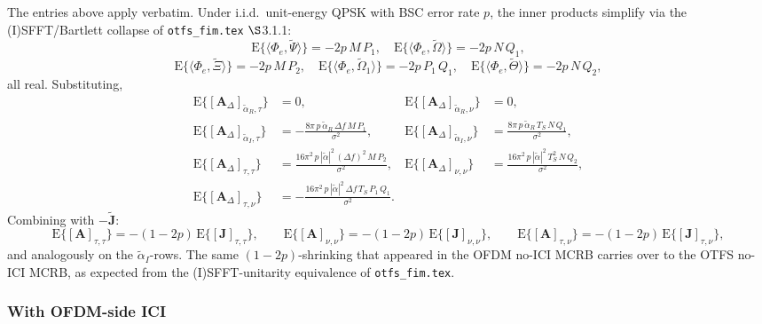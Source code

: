 \documentclass[11pt]{article}
\begin{document}
The entries above apply verbatim. Under i.i.d.\ unit-energy QPSK with BSC error rate \(p\), the inner products simplify via the (I)SFFT/Bartlett collapse of \texttt{otfs\_fim.tex} \(\S\)3.1.1:
\begin{equation}
    \mathrm{E}\{\langle \Phi_e, \tilde{\Psi}\rangle\} = -2p\, M\, P_1, \quad
    \mathrm{E}\{\langle \Phi_e, \tilde{\Omega}\rangle\} = -2p\, N\, Q_1,
\end{equation}
\begin{equation}
    \mathrm{E}\{\langle \Phi_e, \tilde{\Xi}\rangle\} = -2p\, M\, P_2, \quad
    \mathrm{E}\{\langle \Phi_e, \tilde{\Omega}_1\rangle\} = -2p\, P_1\, Q_1, \quad
    \mathrm{E}\{\langle \Phi_e, \tilde{\Theta}\rangle\} = -2p\, N\, Q_2,
\end{equation}
all real. Substituting,
\begin{align}
    \mathrm{E}\{[\bm{A}_\Delta]_{\tilde{\alpha}_R, \tau}\} &= 0, &
    \mathrm{E}\{[\bm{A}_\Delta]_{\tilde{\alpha}_R, \nu}\} &= 0, \\
    \mathrm{E}\{[\bm{A}_\Delta]_{\tilde{\alpha}_I, \tau}\} &= -\tfrac{8\pi\, p\, \tilde{\alpha}_R\, \Delta f\, M\, P_1}{\sigma^2}, &
    \mathrm{E}\{[\bm{A}_\Delta]_{\tilde{\alpha}_I, \nu}\} &= \tfrac{8\pi\, p\, \tilde{\alpha}_R\, T_S\, N\, Q_1}{\sigma^2}, \\
    \mathrm{E}\{[\bm{A}_\Delta]_{\tau, \tau}\} &= \tfrac{16\pi^2\, p\, |\tilde{\alpha}|^2\, (\Delta f)^2\, M\, P_2}{\sigma^2}, &
    \mathrm{E}\{[\bm{A}_\Delta]_{\nu, \nu}\} &= \tfrac{16\pi^2\, p\, |\tilde{\alpha}|^2\, T_S^2\, N\, Q_2}{\sigma^2}, \\
    \mathrm{E}\{[\bm{A}_\Delta]_{\tau, \nu}\} &= -\tfrac{16\pi^2\, p\, |\tilde{\alpha}|^2\, \Delta f\, T_S\, P_1\, Q_1}{\sigma^2}. & &
\end{align}
Combining with \(-\tilde{\bm{J}}\):
\begin{equation}
    \mathrm{E}\{[\bm{A}]_{\tau,\tau}\} = -(1-2p)\, \mathrm{E}\{[\bm{J}]_{\tau,\tau}\}, \qquad
    \mathrm{E}\{[\bm{A}]_{\nu,\nu}\} = -(1-2p)\, \mathrm{E}\{[\bm{J}]_{\nu,\nu}\}, \qquad
    \mathrm{E}\{[\bm{A}]_{\tau,\nu}\} = -(1-2p)\, \mathrm{E}\{[\bm{J}]_{\tau,\nu}\},
\end{equation}
and analogously on the \(\tilde{\alpha}_I\)-rows. The same \((1-2p)\)-shrinking that appeared in the OFDM no-ICI MCRB carries over to the OTFS no-ICI MCRB, as expected from the (I)SFFT-unitarity equivalence of \texttt{otfs\_fim.tex}.

\subsubsection{With OFDM-side ICI}
\end{document}
